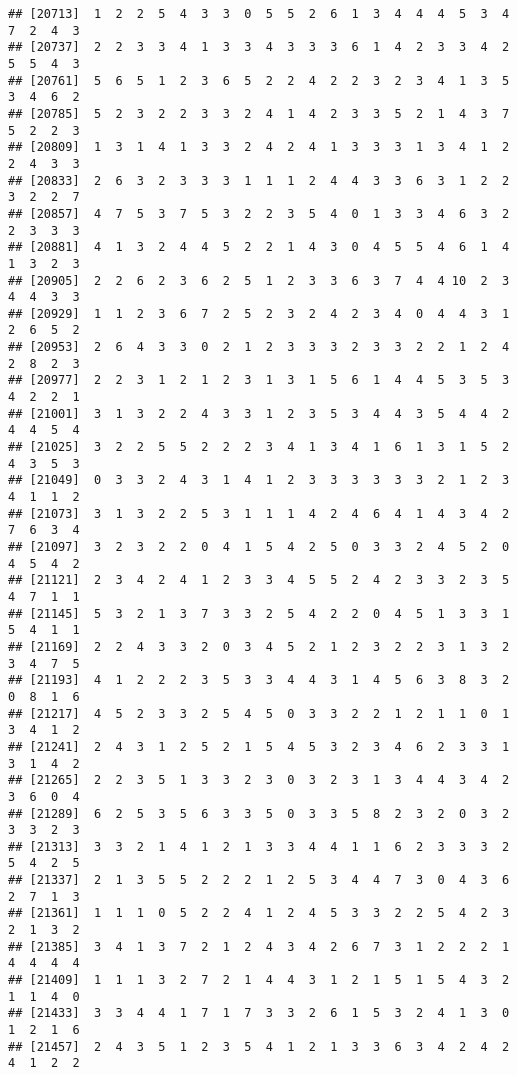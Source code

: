 \documentclass[
]{article}
\begin{document}
\begin{verbatim}
## [20713]  1  2  2  5  4  3  3  0  5  5  2  6  1  3  4  4  4  5  3  4  7  2  4  3
## [20737]  2  2  3  3  4  1  3  3  4  3  3  3  6  1  4  2  3  3  4  2  5  5  4  3
## [20761]  5  6  5  1  2  3  6  5  2  2  4  2  2  3  2  3  4  1  3  5  3  4  6  2
## [20785]  5  2  3  2  2  3  3  2  4  1  4  2  3  3  5  2  1  4  3  7  5  2  2  3
## [20809]  1  3  1  4  1  3  3  2  4  2  4  1  3  3  3  1  3  4  1  2  2  4  3  3
## [20833]  2  6  3  2  3  3  3  1  1  1  2  4  4  3  3  6  3  1  2  2  3  2  2  7
## [20857]  4  7  5  3  7  5  3  2  2  3  5  4  0  1  3  3  4  6  3  2  2  3  3  3
## [20881]  4  1  3  2  4  4  5  2  2  1  4  3  0  4  5  5  4  6  1  4  1  3  2  3
## [20905]  2  2  6  2  3  6  2  5  1  2  3  3  6  3  7  4  4 10  2  3  4  4  3  3
## [20929]  1  1  2  3  6  7  2  5  2  3  2  4  2  3  4  0  4  4  3  1  2  6  5  2
## [20953]  2  6  4  3  3  0  2  1  2  3  3  3  2  3  3  2  2  1  2  4  2  8  2  3
## [20977]  2  2  3  1  2  1  2  3  1  3  1  5  6  1  4  4  5  3  5  3  4  2  2  1
## [21001]  3  1  3  2  2  4  3  3  1  2  3  5  3  4  4  3  5  4  4  2  4  4  5  4
## [21025]  3  2  2  5  5  2  2  2  3  4  1  3  4  1  6  1  3  1  5  2  4  3  5  3
## [21049]  0  3  3  2  4  3  1  4  1  2  3  3  3  3  3  3  2  1  2  3  4  1  1  2
## [21073]  3  1  3  2  2  5  3  1  1  1  4  2  4  6  4  1  4  3  4  2  7  6  3  4
## [21097]  3  2  3  2  2  0  4  1  5  4  2  5  0  3  3  2  4  5  2  0  4  5  4  2
## [21121]  2  3  4  2  4  1  2  3  3  4  5  5  2  4  2  3  3  2  3  5  4  7  1  1
## [21145]  5  3  2  1  3  7  3  3  2  5  4  2  2  0  4  5  1  3  3  1  5  4  1  1
## [21169]  2  2  4  3  3  2  0  3  4  5  2  1  2  3  2  2  3  1  3  2  3  4  7  5
## [21193]  4  1  2  2  2  3  5  3  3  4  4  3  1  4  5  6  3  8  3  2  0  8  1  6
## [21217]  4  5  2  3  3  2  5  4  5  0  3  3  2  2  1  2  1  1  0  1  3  4  1  2
## [21241]  2  4  3  1  2  5  2  1  5  4  5  3  2  3  4  6  2  3  3  1  3  1  4  2
## [21265]  2  2  3  5  1  3  3  2  3  0  3  2  3  1  3  4  4  3  4  2  3  6  0  4
## [21289]  6  2  5  3  5  6  3  3  5  0  3  3  5  8  2  3  2  0  3  2  3  3  2  3
## [21313]  3  3  2  1  4  1  2  1  3  3  4  4  1  1  6  2  3  3  3  2  5  4  2  5
## [21337]  2  1  3  5  5  2  2  2  1  2  5  3  4  4  7  3  0  4  3  6  2  7  1  3
## [21361]  1  1  1  0  5  2  2  4  1  2  4  5  3  3  2  2  5  4  2  3  2  1  3  2
## [21385]  3  4  1  3  7  2  1  2  4  3  4  2  6  7  3  1  2  2  2  1  4  4  4  4
## [21409]  1  1  1  3  2  7  2  1  4  4  3  1  2  1  5  1  5  4  3  2  1  1  4  0
## [21433]  3  3  4  4  1  7  1  7  3  3  2  6  1  5  3  2  4  1  3  0  1  2  1  6
## [21457]  2  4  3  5  1  2  3  5  4  1  2  1  3  3  6  3  4  2  4  2  4  1  2  2

\end{verbatim}
\end{document}
